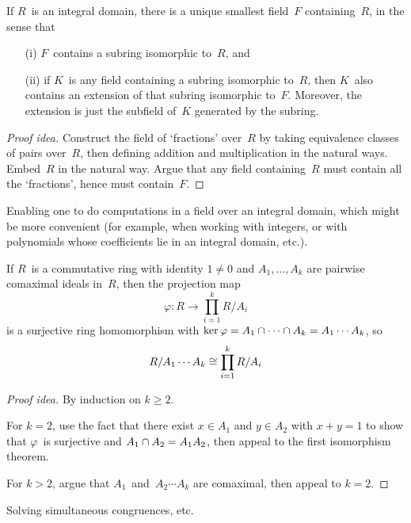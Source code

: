 \begin{thm}
If \(R\)~is an integral domain, there is a unique smallest field~\(F\) containing~\(R\), in the sense that
\begin{enumerate}[itemsep=0pt]
\item[(i)] \(F\)~contains a subring isomorphic to~\(R\), and
\item[(ii)] if \(K\)~is any field containing a subring isomorphic to~\(R\), then \(K\)~also contains an extension of that subring isomorphic to~\(F\). Moreover, the extension is just the subfield of~\(K\) generated by the subring.
\end{enumerate}
\end{thm}
\begin{proof}[Proof idea]
Construct the field of `fractions' over~\(R\) by taking equivalence classes of pairs over~\(R\), then defining addition and multiplication in the natural ways. Embed~\(R\) in the natural way. Argue that any field containing~\(R\) must contain all the `fractions', hence must contain~\(F\).
\end{proof}
\begin{app}
Enabling one to do computations in a field over an integral domain, which might be more convenient (for example, when working with integers, or with polynomials whose coefficients lie in an integral domain, etc.).
\end{app}

\begin{thm}
If \(R\)~is a commutative ring with identity \(1\ne0\) and \(A_1,\ldots,A_k\) are pairwise comaximal ideals in~\(R\), then the projection map
\[\varphi:R\to\prod_{i=1}^k R/A_i\]
is a surjective ring homomorphism with \(\ker\varphi=A_1\cap\cdots\cap A_k=A_1\cdots A_k\), so
\[R/A_1\cdots A_k\cong\prod_{i=1}^k R/A_i\]
\end{thm}
\begin{proof}[Proof idea]
By induction on \(k\ge 2\).

For \(k=2\), use the fact that there exist \(x\in A_1\) and \(y\in A_2\) with \(x+y=1\) to show that \(\varphi\)~is surjective and \(A_1\cap A_2=A_1A_2\), then appeal to the first isomorphism theorem.

For \(k>2\), argue that \(A_1\)~and~\(A_2\cdots A_k\) are comaximal, then appeal to \(k=2\).
\end{proof}

\begin{app}
Solving simultaneous congruences, etc.
\end{app}

